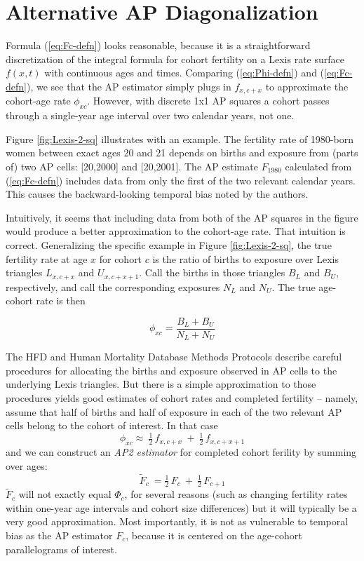 \documentclass[12pt,letterpaper]{article}
\begin{document}
\section{Alternative AP Diagonalization}

Formula (\ref{eq:Fc-defn}) looks reasonable, because it is a straightforward
discretization of the integral formula for cohort fertility 
on a Lexis rate surface $f(x,t)$ with continuous ages and times.
Comparing (\ref{eq:Phi-defn}) and (\ref{eq:Fc-defn}), we see that the AP estimator simply plugs in $f_{x,c+x}$ to approximate the cohort-age rate $\phi_{xc}$. 
However,  with discrete 1x1 AP squares a cohort passes through a single-year age interval over two calendar years, not one.  

Figure \ref{fig:Lexis-2-sq} illustrates with an example. The fertility rate of 1980-born women between exact ages 20 and 21 depends on births and exposure from (parts of) two AP cells: [20,2000] and [20,2001]. The AP estimate $F_{1980}$ calculated from (\ref{eq:Fc-defn}) includes data from only the first of the two relevant calendar years. This causes the backward-looking temporal bias noted by the authors. 

Intuitively, it seems that including data from both of the AP squares in the figure would produce a better approximation to the cohort-age rate. That intuition is correct.
Generalizing the specific example in Figure \ref{fig:Lexis-2-sq}, the true fertility rate at age $x$ for cohort $c$ is the ratio of births to exposure over Lexis triangles $L_{x,c+x}$ and $U_{x,c+x+1}$. Call the births in those triangles $B_L$ and $B_U$, respectively, and call the corresponding exposures $N_L$ and $N_U$. The true age-cohort rate is then

\begin{equation}
    \phi_{xc} = \frac{B_L + B_U}{N_L + N_U}
\end{equation}

The HFD and Human Mortality Database \citeyearpar{HMD2023} Methods Protocols describe careful procedures for allocating the births and exposure observed in AP cells to the underlying Lexis triangles. But there is a simple approximation to those procedures yields good estimates of cohort rates and completed fertility -- namely, assume that half of births and half of exposure in each of the two relevant AP cells belong to the cohort of interest. In that case 
\begin{equation}
    \phi_{xc} \approx \: \tfrac{1}{2}\, f_{x,c+x} \:+\: \tfrac{1}{2}\, f_{x,c+x+1}
\end{equation}
and we can construct an \textit{AP2 estimator} for completed cohort ferility by summing over ages:
\begin{equation}
\label{eq:F-tilde-defn}
    \tilde{F}_c \:= \tfrac{1}{2}\, F_c \:+\: \tfrac{1}{2}\, F_{c+1}    
\end{equation}
$\tilde{F}_c$ will not exactly equal $\Phi_c$, for several reasons (such as changing fertility rates within one-year age intervals and cohort size differences)
but it will typically be a very good approximation. Most importantly, it is not as vulnerable to temporal bias as the AP estimator $F_c$, because it is centered on the age-cohort parallelograms of interest. 
\end{document}
